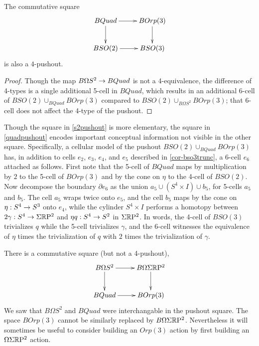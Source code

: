 \documentclass{amsart}
\begin{document}
\begin{corollary}
\label{quadpushout}
The commutative square
\[
\vcenter{\hbox{\xymatrix{
BQuad \ar[r] \ar[d] & BOrp(3) \ar[d] \\
BSO(2) \ar[r] & BSO(3)
}}}
\]
is also a $4$-pushout.
\end{corollary}
\begin{proof}
Though the map $B\Omega S^2 \rightarrow BQuad$ is not a 4-equivalence, the difference of 4-types is a single additional 5-cell in $BQuad$, which results in an additional 6-cell of $BSO(2) \cup_{BQuad} BOrp(3)$ compared to $BSO(2) \cup_{B\Omega S^2} BOrp(3)$; that 6-cell does not affect the 4-type of the pushout.
\end{proof}

\nid Though the square in \cref{s2pushout} is more elementary, the square in \cref{quadpushout} encodes important conceptual information not visible in the other square.  Specifically, a cellular model of the pushout $BSO(2) \cup_{BQuad} BOrp(3)$ has, in addition to cells $e_2$, $e_3$, $e_4$, and $e_5$ described in \cref{cor-bso3trunc}, a 6-cell $e_6$ attached as follows.  First note that the 5-cell of $BQuad$ maps by multiplication by $2$ to the 5-cell of $BOrp(3)$ and by the cone on $\eta$ to the 4-cell of $BSO(2)$.  %
Now decompose the boundary $\partial e_6$ as the union $a_5 \cup (S^4 \times I) \cup b_5$, for 5-cells $a_5$ and $b_5$.  The cell $a_5$ wraps twice onto $e_5$, and the cell $b_5$ maps by the cone on $\eta: S^4 \rightarrow S^3$ onto $e_4$, while the cylinder $S^4 \times I$ performs a homotopy between $2 \gamma : S^4 \rightarrow \Sigma \mathbb R \mathrm{P}^2$ and $\eta q: S^4 \rightarrow S^2$ in $\Sigma \mathbb R \mathrm{P}^2$.  In words, the 4-cell of $BSO(3)$ trivializes $q$ while the 5-cell trivializes $\gamma$, and the 6-cell witnesses the equivalence of $\eta$ times the trivialization of $q$ with $2$ times the trivialization of $\gamma$.

\begin{remark}
There is a commutative square (but not a 4-pushout),
\[
\vcenter{\hbox{\xymatrix{
B\Omega S^2 \ar[r] \ar[d] & B\Omega \Sigma \RP^2 \ar[d] \\
BQuad \ar[r] & BOrp(3)
}}}
\]
We saw that $B\Omega S^2$ and $BQuad$ were interchangable in the pushout square.  The space $BOrp(3)$ cannot be similarly replaced by $B\Omega \Sigma \mathbb R \mathrm{P}^2$.  Nevertheless it will sometimes be useful to consider building an $Orp(3)$ action by first building an $\Omega \Sigma \mathbb R \mathrm{P}^2$ action.
\end{remark}
\end{document}
